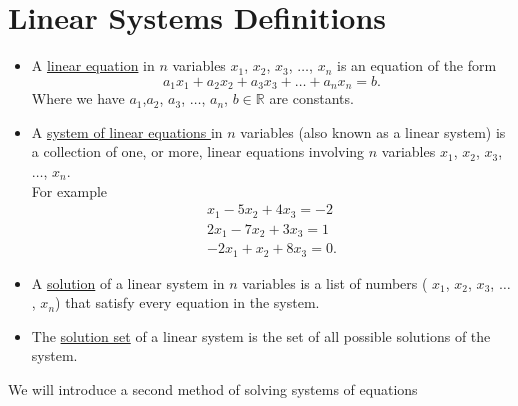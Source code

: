 \documentclass{report}
\begin{document}
\section{Linear Systems Definitions}
\begin{itemize}
        \item A \underline{linear equation}  in $n$ variables $x_1$, $x_2$, $x_3$, $\ldots$, $x_n$ is an equation of the form
\[
a_1x_1+a_2x_2+a_3x_3+\ldots+a_nx_n =b
.\] 
Where we have $a_1$,$a_2$, $a_3$, $\ldots$, $a_n$, $b \in \mathbb{R}$ are constants.
\item A \underline{system of linear equations } in $n$ variables (also known as a linear system) is a collection of one, or more, linear equations involving $n$ variables $x_1$, $x_2$, $x_3$, $\ldots$, $x_n$.\\ 
        For example \begin{align*}
                x_1 -5x_2 +4x_3 = -2\\
                2x_1 -7x_2 +3x_3 =1\\
                -2x_1+x_2+8x_3 =0
.\end{align*}
\item A \underline{solution}  of a linear system in $n$ variables is a list of numbers ( $x_1$, $x_2$, $x_3$, $\ldots$, $x_n$) that satisfy every equation in the system.
\item The \underline{solution set}  of a linear system is the set of all possible solutions of the system.
\end{itemize}
We will introduce a second method of solving systems of equations\\
\newpage
\end{document}
